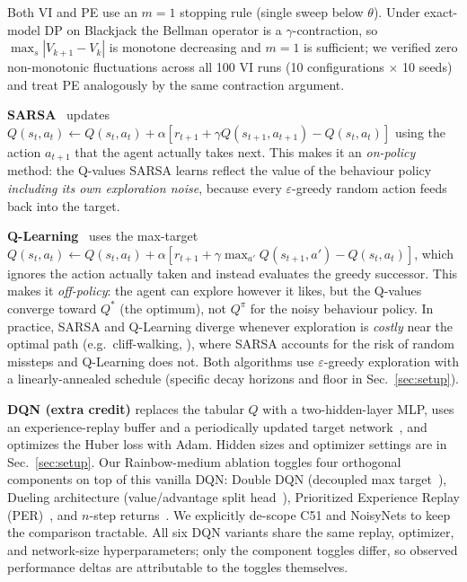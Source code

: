 \documentclass[conference]{IEEEtran}
\begin{document}
Both VI and PE use an $m = 1$ stopping rule (single sweep below
$\theta$). Under exact-model DP on Blackjack the Bellman
operator is a $\gamma$-contraction, so $\max_s |V_{k+1} - V_k|$
is monotone decreasing and $m = 1$ is sufficient; we verified
zero non-monotonic fluctuations across all 100 VI runs (10
configurations $\times$ 10 seeds) and treat PE analogously by
the same contraction argument.

\textbf{SARSA}~\cite{sutton2018} updates
$Q(s_t, a_t) \leftarrow Q(s_t, a_t) + \alpha[r_{t+1} + \gamma Q(s_{t+1},
a_{t+1}) - Q(s_t, a_t)]$ using the action $a_{t+1}$ that the agent
actually takes next. This makes it an \emph{on-policy} method: the
Q-values SARSA learns reflect the value of the behaviour policy
\emph{including its own exploration noise}, because every $\varepsilon$-greedy
random action feeds back into the target.

\textbf{Q-Learning}~\cite{sutton2018} uses the max-target
$Q(s_t, a_t) \leftarrow Q(s_t, a_t) + \alpha[r_{t+1} + \gamma \max_{a'}
Q(s_{t+1}, a') - Q(s_t, a_t)]$, which ignores the action actually taken
and instead evaluates the greedy successor. This makes it
\emph{off-policy}: the agent can explore however it likes, but the
Q-values converge toward $Q^*$ (the optimum), not $Q^\pi$ for the noisy
behaviour policy. In practice, SARSA and Q-Learning diverge whenever
exploration is \emph{costly} near the optimal path (e.g.\ cliff-walking,
\cite[Example 6.6]{sutton2018}), where SARSA accounts for the risk of
random missteps and Q-Learning does not. Both
algorithms use $\varepsilon$-greedy exploration with a linearly-annealed
schedule (specific decay horizons and floor in
Sec.~\ref{sec:setup}).

\textbf{DQN (extra credit)} replaces the tabular $Q$ with a two-hidden-layer
MLP, uses an experience-replay buffer and a periodically updated target
network~\cite{mnih2015}, and optimizes the Huber loss with Adam. Hidden
sizes and optimizer settings are in Sec.~\ref{sec:setup}. Our Rainbow-medium ablation toggles four orthogonal
components on top of this vanilla DQN: Double DQN (decoupled max
target~\cite{vanhasselt2016}), Dueling architecture (value/advantage split
head~\cite{wang2016}), Prioritized Experience Replay
(PER)~\cite{schaul2016}, and $n$-step returns~\cite{sutton1988}. We
explicitly de-scope C51 and NoisyNets to keep the comparison tractable. All
six DQN variants share the same replay, optimizer, and network-size
hyperparameters; only the component toggles differ, so observed performance
deltas are attributable to the toggles themselves.
\end{document}
